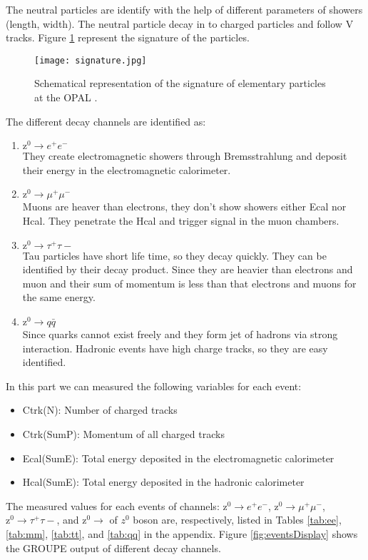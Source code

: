  The neutral particles are identify with the help of different parameters of showers (length, width). The neutral particle decay in to charged particles and follow V tracks. Figure \ref{fig:signature} represent the signature of the particles. 
 
 \begin{figure}[H]
 	\centering
 	\texttt{[image: signature.jpg]}
 	\caption{Schematical representation of the signature of elementary particles at the OPAL \cite{manual}. }
 	\label{fig:signature}
 \end{figure}
 
 
The different decay channels are identified as:
\begin{enumerate}
\item $ \text{z}^0\rightarrow e^+e^- $\\
They create electromagnetic showers through Bremsstrahlung and deposit their energy in the electromagnetic calorimeter. 

\item $ \text{z}^0\rightarrow \mu^+\mu^- $\\ 
Muons are heaver than electrons, they don't show showers either Ecal nor Hcal. They penetrate the Hcal and trigger signal in the muon chambers.

\item $ \text{z}^0\rightarrow \tau^+\tau-$\\
Tau particles have short life time, so they decay quickly. They can be identified by their decay product. Since they are heavier than electrons and muon and their sum of momentum is less than that electrons and muons for the same energy.

\item $ \text{z}^0\rightarrow q\bar{q}$\\
Since quarks cannot exist freely and they form jet of hadrons via strong interaction. Hadronic events have high charge tracks, so they are easy identified.
\end{enumerate}

In this part we can measured the following variables for each event:
\begin{itemize}
	\item Ctrk(N): Number of charged tracks
	\item Ctrk(SumP): Momentum of all charged tracks
	\item Ecal(SumE): Total energy deposited in the electromagnetic calorimeter
	\item Hcal(SumE): Total energy deposited in the hadronic calorimeter
\end{itemize}
The measured values for each events of channels: $ \text{z}^0\rightarrow e^+e^- $, $ \text{z}^0\rightarrow \mu^+\mu^- $, $ \text{z}^0\rightarrow \tau^+\tau-$,  and $ \text{z}^0\rightarrow  $  of $ z^0 $ boson are, respectively, listed in Tables \ref{tab:ee}, \ref{tab:mm}, \ref{tab:tt}, and \ref{tab:qq} in the appendix. Figure \ref{fig:eventsDisplay} shows the GROUPE output of different decay channels.



